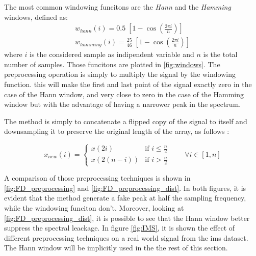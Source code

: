 The most common windowing funcitons are the \emph{Hann} and the \emph{Hamming} windows, defined as:
\begin{eqnarray}
    w_{hann}(i) = 0.5\; \left[1 - \cos \left ( \frac{2 \pi i}{n} \right) \right] \\
    w_{hamming}(i) = \frac{25}{46}\; \left[1 - \cos \left ( \frac{2 \pi i}{n} \right) \right]
\end{eqnarray}
where $i$ is the considered sample as indipendent variable and $n$ is the total number of samples. Those funcitons are plotted in \autoref{fig:windows}. The preprocessing operation is simply to multiply the signal by the windowing function. this will make the first and last point of the signal exactly zero in the case of the Hann window, and very close to zero in the case of the Hamming window but with the advantage of having a narrower peak in the spectrum. 

The  method is simply to concatenate a flipped copy of the signal to itself and downsampling it to preserve the original length of the array, as follows \cite{Preprocessing}:

\begin{equation}
    x_{new}(i) = \begin{cases}
        x(2i) & \text{if } i \leq \frac{n}{2} \\
        x(2(n-i)) & \text{if } i > \frac{n}{2}
    \end{cases} \qquad \forall i \in [1,n]
\end{equation}

A comparison of those preprocessing techniques is shown in \autoref{fig:FD_preprocessing} and \autoref{fig:FD_preprocessing_dist}. In both figures, it is evident that the  method generate a fake peak at half the sampling frequency, while the windowing funciton don't. Moreover, looking at \autoref{fig:FD_preprocessing_dist}, it is possible to see that the Hann window better suppress the spectral leackage.
In figure \autoref{fig:IMS}, it is shown the effect of different preprocessing techniques on a real world signal from the \gls{ims} dataset. The Hann window will be implicitly used in the the rest of this section.



